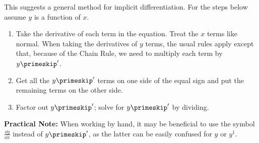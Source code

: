 This suggests a general method for implicit differentiation.  For the steps below assume $y$ is a function of $x$.
\begin{enumerate}
\item Take the derivative of each term in the equation.  Treat the $x$ terms like normal.  When taking the derivatives of $y$ terms, the usual rules apply except that, because of the Chain Rule, we need to multiply each term by $y\primeskip'$.
\item Get all the $y\primeskip'$ terms on one side of the equal sign and put the remaining terms on the other side.
\item Factor out $y\primeskip'$;  solve for $y\primeskip'$ by dividing.
\end{enumerate}

\textbf{Practical Note:} When working by hand, it may be beneficial to use the symbol $\frac{\dd y}{\dd x}$ instead of $y\primeskip'$, as the latter can be easily confused for $y$ or $y^1$.

